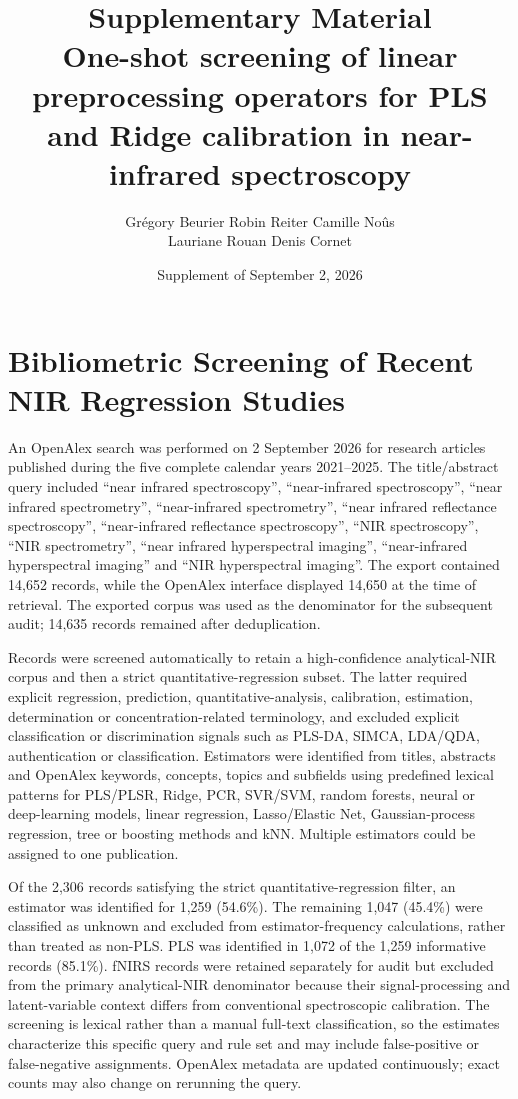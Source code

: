 \documentclass[11pt,a4paper]{article}
\title{\textbf{Supplementary Material}\\
One-shot screening of linear preprocessing operators for PLS and Ridge calibration in near-infrared spectroscopy}
\author{
Gr{\'e}gory Beurier \quad Robin Reiter \quad Camille No{\^u}s\\[0.35em]
Lauriane Rouan \quad Denis Cornet
}
\date{Supplement of September 2, 2026}
\begin{document}
\maketitle

\tableofcontents

\section{Bibliometric Screening of Recent NIR Regression Studies}
\label{sec:sup_bibliometric}

An OpenAlex search \citep{priem2022openalex} was performed on 2 September
2026 for research articles published during the five complete calendar years
2021--2025.  The title/abstract query included ``near infrared spectroscopy'',
``near-infrared spectroscopy'', ``near infrared spectrometry'',
``near-infrared spectrometry'', ``near infrared reflectance spectroscopy'',
``near-infrared reflectance spectroscopy'', ``NIR spectroscopy'', ``NIR
spectrometry'', ``near infrared hyperspectral imaging'', ``near-infrared
hyperspectral imaging'' and ``NIR hyperspectral imaging''.  The export
contained 14,652 records, while the OpenAlex interface displayed 14,650 at
the time of retrieval.  The exported corpus was used as the denominator for
the subsequent audit; 14,635 records remained after deduplication.

Records were screened automatically to retain a high-confidence
analytical-NIR corpus and then a strict quantitative-regression subset.  The
latter required explicit regression, prediction, quantitative-analysis,
calibration, estimation, determination or concentration-related terminology,
and excluded explicit classification or discrimination signals such as
PLS-DA, SIMCA, LDA/QDA, authentication or classification.  Estimators were
identified from titles, abstracts and OpenAlex keywords, concepts, topics and
subfields using predefined lexical patterns for PLS/PLSR, Ridge, PCR,
SVR/SVM, random forests, neural or deep-learning models, linear regression,
Lasso/Elastic Net, Gaussian-process regression, tree or boosting methods and
kNN.  Multiple estimators could be assigned to one publication.

Of the 2,306 records satisfying the strict quantitative-regression filter, an
estimator was identified for 1,259 (54.6\%).  The remaining 1,047 (45.4\%)
were classified as unknown and excluded from estimator-frequency
calculations, rather than treated as non-PLS.  PLS was identified in 1,072 of
the 1,259 informative records (85.1\%).  fNIRS records were retained
separately for audit but excluded from the primary analytical-NIR denominator
because their signal-processing and latent-variable context differs from
conventional spectroscopic calibration.  The screening is lexical rather
than a manual full-text classification, so the estimates characterize this
specific query and rule set and may include false-positive or false-negative
assignments.  OpenAlex metadata are updated continuously; exact counts may
also change on rerunning the query.
\end{document}
